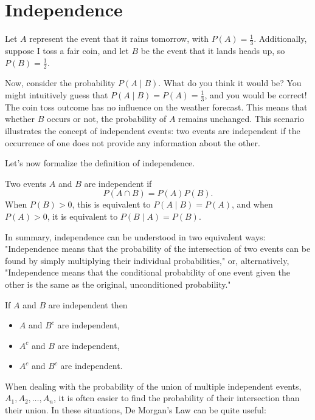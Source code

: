 \section{Independence}
Let $A$ represent the event that it rains tomorrow, with $P(A)=\frac{1}{3}$. Additionally, suppose I toss a fair coin, and let $B$ be the event that it lands heads up, so $P(B)=\frac{1}{2}$.

Now, consider the probability $P(A \mid B)$. What do you think it would be? You might intuitively guess that $P(A \mid B)=P(A)=\frac{1}{3}$, and you would be correct! The coin toss outcome has no influence on the weather forecast. This means that whether $B$ occurs or not, the probability of $A$ remains unchanged. This scenario illustrates the concept of independent events: two events are independent if the occurrence of one does not provide any information about the other.

Let's now formalize the definition of independence.

\begin{definition}[Independence]
    Two events \( A \) and \( B \) are independent if
    \[
        P(A \cap B)=P(A)P(B).
    \]
    When \(P(B)>0\), this is equivalent to \(P(A\mid B)=P(A)\), and when \(P(A)>0\), it is equivalent to \(P(B\mid A)=P(B)\).
\end{definition}

In summary, independence can be understood in two equivalent ways: "Independence means that the probability of the intersection of two events can be found by simply multiplying their individual probabilities," or, alternatively, "Independence means that the conditional probability of one event given the other is the same as the original, unconditioned probability."

\begin{lemma}
If $A$ and $B$ are independent then
\begin{itemize}
    \item $A$ and $B^c$ are independent,
    \item $A^c$ and $B$ are independent,
    \item $A^c$ and $B^c$ are independent.
\end{itemize}
\end{lemma}

When dealing with the probability of the union of multiple independent events, \( A_1, A_2, \ldots, A_n \), it is often easier to find the probability of their intersection than their union. In these situations, De Morgan's Law can be quite useful:


